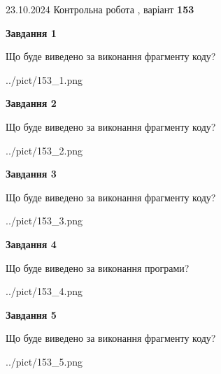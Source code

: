 \documentclass[12pt, ukrainian]{article}
\begin{document}
{\Large{23.10.2024 Контрольна робота , варіант  \No \textbf { 153 }\par}}
{
\begin {large}
{\begin {center}\textbf{Завдання 1}\end {center}}

Що буде виведено за виконання фрагменту коду?\par
\begin{center}
	{../pict/153_1.png}
\end{center}
\newpage

{\begin {center}\textbf{Завдання 2}\end {center}}

Що буде виведено за виконання фрагменту коду?\par
\begin{center}
	{../pict/153_2.png}
\end{center}
\newpage

{\begin {center}\textbf{Завдання 3}\end {center}}

Що буде виведено за виконання фрагменту коду?\par
\begin{center}
	{../pict/153_3.png}
\end{center}
\newpage

{\begin {center}\textbf{Завдання 4}\end {center}}

Що буде виведено за виконання програми?\par
\begin{center}
	{../pict/153_4.png}
\end{center}
\newpage

{\begin {center}\textbf{Завдання 5}\end {center}}

Що буде виведено за виконання фрагменту коду?\par
\begin{center}
	{../pict/153_5.png}
\end{center}
\newpage


\end{large}}
\end{document}
